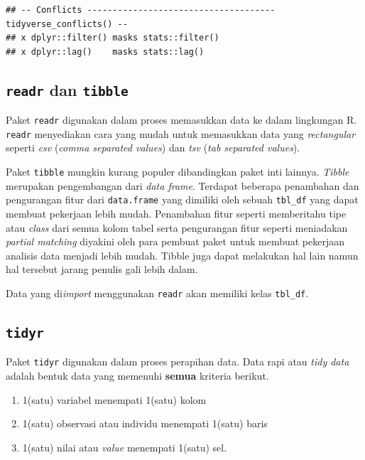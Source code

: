 \documentclass[]{book}
\begin{document}
\begin{verbatim}
## -- Conflicts ------------------------------------- tidyverse_conflicts() --
## x dplyr::filter() masks stats::filter()
## x dplyr::lag()    masks stats::lag()
\end{verbatim}

\subsection{\texorpdfstring{\texttt{readr} dan
\texttt{tibble}}{readr dan tibble}}\label{readr-dan-tibble}

Paket \texttt{readr} digunakan dalam proses memasukkan data ke dalam
lingkungan R. \texttt{readr} menyediakan cara yang mudah untuk
memasukkan data yang \emph{rectangular} seperti \emph{csv} (\emph{comma
separated values}) dan \emph{tsv} (\emph{tab separated values}).

Paket \texttt{tibble} mungkin kurang populer dibandingkan paket inti
lainnya. \emph{Tibble} merupakan pengembangan dari \emph{data frame}.
Terdapat beberapa penambahan dan pengurangan fitur dari
\texttt{data.frame} yang dimiliki oleh sebuah \texttt{tbl\_df} yang
dapat membuat pekerjaan lebih mudah. Penambahan fitur seperti
memberitahu tipe atau \emph{class} dari semua kolom tabel serta
pengurangan fitur seperti meniadakan \emph{partial matching} diyakini
oleh para pembuat paket untuk membuat pekerjaan analisis data menjadi
lebih mudah. Tibble juga dapat melakukan hal lain namun hal tersebut
jarang penulis gali lebih dalam.

Data yang di\emph{import} menggunakan \texttt{readr} akan memiliki kelas
\texttt{tbl\_df}.

\subsection{\texorpdfstring{\texttt{tidyr}}{tidyr}}\label{tidyr}

Paket \texttt{tidyr} digunakan dalam proses perapihan data. Data rapi
atau \emph{tidy data} adalah bentuk data yang memenuhi \textbf{semua}
kriteria berikut.

\begin{enumerate}
\def\labelenumi{\arabic{enumi}.}
\item
  1(satu) variabel menempati 1(satu) kolom
\item
  1(satu) observasi atau individu menempati 1(satu) baris
\item
  1(satu) nilai atau \emph{value} menempati 1(satu) sel.
\end{enumerate}
\end{document}
